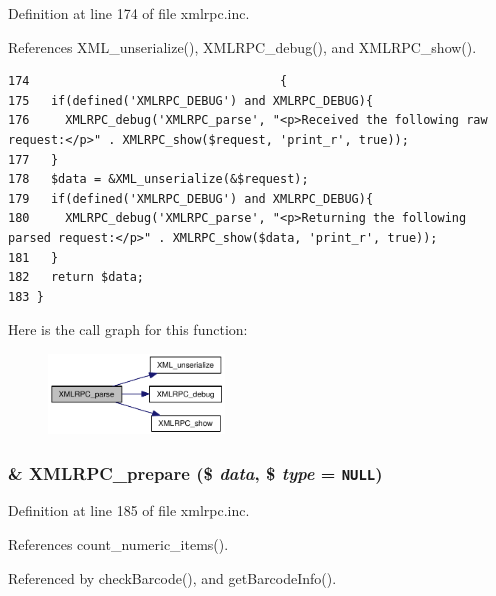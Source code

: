Definition at line 174 of file xmlrpc.inc.

References XML\_\-unserialize(), XMLRPC\_\-debug(), and XMLRPC\_\-show().

\begin{Code}\begin{verbatim}174                                   {
175   if(defined('XMLRPC_DEBUG') and XMLRPC_DEBUG){
176     XMLRPC_debug('XMLRPC_parse', "<p>Received the following raw request:</p>" . XMLRPC_show($request, 'print_r', true));
177   }
178   $data = &XML_unserialize(&$request);
179   if(defined('XMLRPC_DEBUG') and XMLRPC_DEBUG){
180     XMLRPC_debug('XMLRPC_parse', "<p>Returning the following parsed request:</p>" . XMLRPC_show($data, 'print_r', true));
181   }
182   return $data;
183 }
\end{verbatim}
\end{Code}




Here is the call graph for this function:\nopagebreak
\begin{figure}[H]
\begin{center}
\leavevmode
\includegraphics[width=133pt]{xmlrpc_8inc_708b2136ca600664d2207a511b3cf3f8_cgraph}
\end{center}
\end{figure}
\hypertarget{xmlrpc_8inc_c13be54b26e0803d8745e4f019dcfd8a}{
\subsubsection{\setlength{\rightskip}{0pt plus 5cm}\& XMLRPC\_\-prepare (\$ {\em data}, \$ {\em type} = {\tt NULL})}}
\label{xmlrpc_8inc_c13be54b26e0803d8745e4f019dcfd8a}




Definition at line 185 of file xmlrpc.inc.

References count\_\-numeric\_\-items().

Referenced by checkBarcode(), and getBarcodeInfo().

